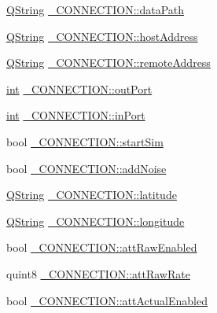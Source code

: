 \begin{DoxyCompactItemize}
\hyperlink{group___u_a_v_objects_plugin_gab9d252f49c333c94a72f97ce3105a32d}{Q\-String} \hyperlink{group___h_i_t_l_plugin_ga4505c573ba399fc3e915fec6842c3bcb}{\-\_\-\-C\-O\-N\-N\-E\-C\-T\-I\-O\-N\-::data\-Path}
\item 
\hyperlink{group___u_a_v_objects_plugin_gab9d252f49c333c94a72f97ce3105a32d}{Q\-String} \hyperlink{group___h_i_t_l_plugin_ga21da3bd31909fdf7fd5116c2a91a1176}{\-\_\-\-C\-O\-N\-N\-E\-C\-T\-I\-O\-N\-::host\-Address}
\item 
\hyperlink{group___u_a_v_objects_plugin_gab9d252f49c333c94a72f97ce3105a32d}{Q\-String} \hyperlink{group___h_i_t_l_plugin_ga72b83e685c950b6c36c9eed28c775ec4}{\-\_\-\-C\-O\-N\-N\-E\-C\-T\-I\-O\-N\-::remote\-Address}
\item 
\hyperlink{ioapi_8h_a787fa3cf048117ba7123753c1e74fcd6}{int} \hyperlink{group___h_i_t_l_plugin_gaaba6cf28320e1105f7320ea8a21df15b}{\-\_\-\-C\-O\-N\-N\-E\-C\-T\-I\-O\-N\-::out\-Port}
\item 
\hyperlink{ioapi_8h_a787fa3cf048117ba7123753c1e74fcd6}{int} \hyperlink{group___h_i_t_l_plugin_gabf3d6472bdcac5895a53143e1f84fb09}{\-\_\-\-C\-O\-N\-N\-E\-C\-T\-I\-O\-N\-::in\-Port}
\item 
bool \hyperlink{group___h_i_t_l_plugin_ga17c6b00bf3f43c686cca76b3286ba75c}{\-\_\-\-C\-O\-N\-N\-E\-C\-T\-I\-O\-N\-::start\-Sim}
\item 
bool \hyperlink{group___h_i_t_l_plugin_ga0d3c230504eb051a77593129ea6cd79f}{\-\_\-\-C\-O\-N\-N\-E\-C\-T\-I\-O\-N\-::add\-Noise}
\item 
\hyperlink{group___u_a_v_objects_plugin_gab9d252f49c333c94a72f97ce3105a32d}{Q\-String} \hyperlink{group___h_i_t_l_plugin_gac06d25b8e020f633a60fadb7e7eedfa9}{\-\_\-\-C\-O\-N\-N\-E\-C\-T\-I\-O\-N\-::latitude}
\item 
\hyperlink{group___u_a_v_objects_plugin_gab9d252f49c333c94a72f97ce3105a32d}{Q\-String} \hyperlink{group___h_i_t_l_plugin_gac60d13c120d3dd97309688a1d7f3d6d7}{\-\_\-\-C\-O\-N\-N\-E\-C\-T\-I\-O\-N\-::longitude}
\item 
bool \hyperlink{group___h_i_t_l_plugin_ga003958320fd5c963c5d2ddff60ffd28b}{\-\_\-\-C\-O\-N\-N\-E\-C\-T\-I\-O\-N\-::att\-Raw\-Enabled}
\item 
quint8 \hyperlink{group___h_i_t_l_plugin_ga70d4f6a60b23f4545d46ff7dfe4c710e}{\-\_\-\-C\-O\-N\-N\-E\-C\-T\-I\-O\-N\-::att\-Raw\-Rate}
\item 
bool \hyperlink{group___h_i_t_l_plugin_ga9b02793b3d0effcdb43df1d5e20012fd}{\-\_\-\-C\-O\-N\-N\-E\-C\-T\-I\-O\-N\-::att\-Actual\-Enabled}
\item 

\end{DoxyCompactItemize}
